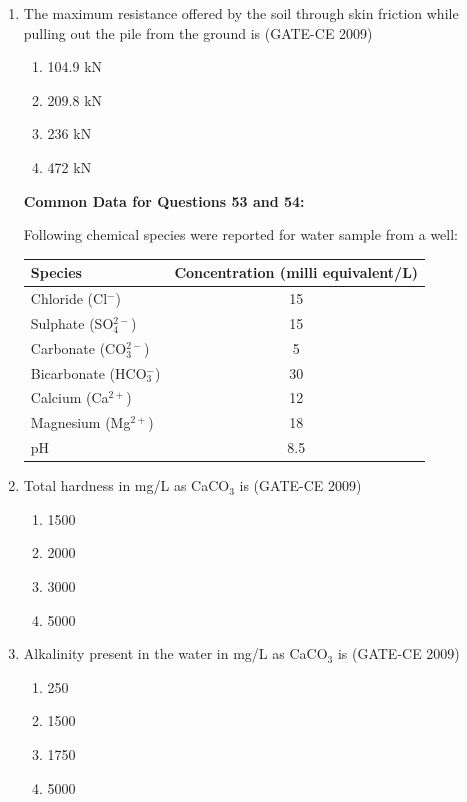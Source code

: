 \documentclass[12pt]{article}
\begin{document}
\begin{enumerate}[label=Q.\arabic*]
    \item The maximum resistance offered by the soil through skin friction while pulling out the pile from the ground is (GATE-CE 2009)
    \begin{enumerate}[label=(\Alph*)]
        \item 104.9 kN 
        \item 209.8 kN 
        \item 236 kN 
        \item 472 kN
    \end{enumerate}

\textbf{Common Data for Questions 53 and 54:}

Following chemical species were reported for water sample from a well:
\begin{center}
\begin{tabular}{|l|c|}
\hline
\textbf{Species} & \textbf{Concentration (milli equivalent/L)} \\
\hline
Chloride (Cl$^-$) & 15 \\
Sulphate (SO$_4^{2-}$) & 15 \\
Carbonate (CO$_3^{2-}$) & 5 \\
Bicarbonate (HCO$_3^-$) & 30 \\
Calcium (Ca$^{2+}$) & 12 \\
Magnesium (Mg$^{2+}$) & 18 \\
pH & 8.5 \\
\hline
\end{tabular}
\end{center}

    \item Total hardness in mg/L as CaCO$_3$ is (GATE-CE 2009)
    \begin{enumerate}[label=(\Alph*)]
        \item 1500 
        \item 2000 
        \item 3000 
        \item 5000
    \end{enumerate}
    
    \item Alkalinity present in the water in mg/L as CaCO$_3$ is (GATE-CE 2009)
    \begin{enumerate}[label=(\Alph*)]
        \item 250 
        \item 1500 
        \item 1750 
        \item 5000
    \end{enumerate}


\end{enumerate}
\end{document}
